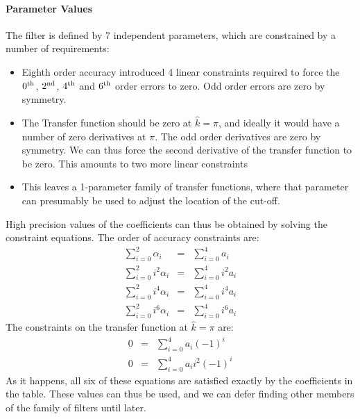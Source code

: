 \documentclass[11pt]{article}%
\begin{document}
\paragraph{Parameter Values} The filter is defined by 7 independent
parameters, which are constrained by a number of requirements:
\begin{itemize}
\item Eighth order accuracy introduced 4 linear constraints required to
      force the $0^{\rm th}$, $2^{\rm nd}$, $4^{\rm th}$ and $6^{\rm
      th}$
      order errors to zero. Odd order errors are zero by symmetry.
\item The Transfer function should be zero at $\hat k=\pi$, and ideally
      it would have a number of zero derivatives at $\pi$. The odd order
      derivatives are zero by symmetry. We can thus force the second
      derivative of the transfer function to be zero. This amounts to
      two more linear constraints
\item This leaves a 1-parameter family of transfer functions, where that
      parameter can presumably be used to adjust the location of the
      cut-off.
\end{itemize}
High precision values of the coefficients can thus be obtained by
solving the constraint equations. The order of accuracy constraints are:
\begin{eqnarray}
\sum_{i=0}^2\alpha_i&=&\sum_{i=0}^4a_i\\
\sum_{i=0}^2i^2\alpha_i&=&\sum_{i=0}^4i^2a_i\\
\sum_{i=0}^2i^4\alpha_i&=&\sum_{i=0}^4i^4a_i\\
\sum_{i=0}^2i^6\alpha_i&=&\sum_{i=0}^4i^6a_i
\end{eqnarray}
The constraints on the transfer function at $\hat k=\pi$ are:
\begin{eqnarray}
0&=&\sum_{i=0}^4a_i(-1)^i\\
0&=&\sum_{i=0}^4a_i i^2 (-1)^i
\end{eqnarray}
As it happens, all six of these equations are satisfied exactly by the
coefficients in the table. These values can thus be used, and we can defer finding other
members of the family of filters until later.
\end{document}
